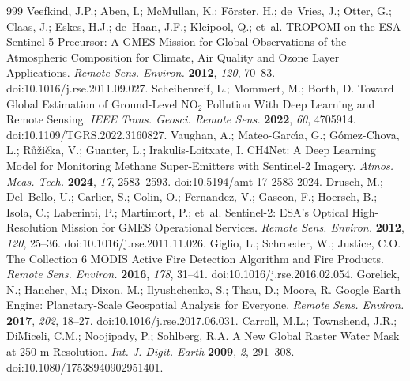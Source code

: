 \documentclass[notspecified,datadescriptor,submit,oneauthor]{Definitions/mdpi}
\begin{document}



\begin{thebibliography}{999}
Veefkind, J.P.; Aben, I.; McMullan, K.; F{\"o}rster, H.; de~Vries, J.; Otter, G.; Claas, J.; Eskes, H.J.; de~Haan, J.F.; Kleipool, Q.; et~al. TROPOMI on the ESA Sentinel-5 Precursor: A GMES Mission for Global Observations of the Atmospheric Composition for Climate, Air Quality and Ozone Layer Applications. {\em Remote Sens. Environ.} {\bf 2012}, {\em 120}, 70--83. doi:10.1016/j.rse.2011.09.027.
Scheibenreif, L.; Mommert, M.; Borth, D. Toward Global Estimation of Ground-Level NO$_2$ Pollution With Deep Learning and Remote Sensing. {\em IEEE Trans. Geosci. Remote Sens.} {\bf 2022}, {\em 60}, 4705914. doi:10.1109/TGRS.2022.3160827.
Vaughan, A.; Mateo-Garc{\'\i}a, G.; G{\'o}mez-Chova, L.; R{\r{u}}{\v{z}}i{\v{c}}ka, V.; Guanter, L.; Irakulis-Loitxate, I. CH4Net: A Deep Learning Model for Monitoring Methane Super-Emitters with Sentinel-2 Imagery. {\em Atmos. Meas. Tech.} {\bf 2024}, {\em 17}, 2583--2593. doi:10.5194/amt-17-2583-2024.
Drusch, M.; Del~Bello, U.; Carlier, S.; Colin, O.; Fernandez, V.; Gascon, F.; Hoersch, B.; Isola, C.; Laberinti, P.; Martimort, P.; et~al. Sentinel-2: ESA's Optical High-Resolution Mission for GMES Operational Services. {\em Remote Sens. Environ.} {\bf 2012}, {\em 120}, 25--36. doi:10.1016/j.rse.2011.11.026.
Giglio, L.; Schroeder, W.; Justice, C.O. The Collection 6 MODIS Active Fire Detection Algorithm and Fire Products. {\em Remote Sens. Environ.} {\bf 2016}, {\em 178}, 31--41. doi:10.1016/j.rse.2016.02.054.
Gorelick, N.; Hancher, M.; Dixon, M.; Ilyushchenko, S.; Thau, D.; Moore, R. Google Earth Engine: Planetary-Scale Geospatial Analysis for Everyone. {\em Remote Sens. Environ.} {\bf 2017}, {\em 202}, 18--27. doi:10.1016/j.rse.2017.06.031.
Carroll, M.L.; Townshend, J.R.; DiMiceli, C.M.; Noojipady, P.; Sohlberg, R.A. A New Global Raster Water Mask at 250 m Resolution. {\em Int. J. Digit. Earth} {\bf 2009}, {\em 2}, 291--308. doi:10.1080/17538940902951401.

\end{thebibliography}
\end{document}
